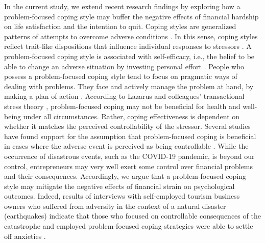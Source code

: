 \documentclass[man]{apa7}
\begin{document}
In the current study, we extend recent research findings by exploring how a problem-focused coping style may buffer the negative effects of financial hardship on life satisfaction and the intention to quit. 
Coping styles are generalized patterns of attempts to overcome adverse conditions \parencite[e.g.,][]{Carver1994}. 
In this sense, coping styles reflect trait-like dispositions that influence individual responses to stressors \parencite{Carver1994}.
A problem-focused coping style is associated with self-efficacy, i.e., the belief to be able to change an adverse situation by investing personal effort \parencite{Bandura.1986}. 
People who possess a problem-focused coping style tend to focus on pragmatic ways of dealing with problems.
They face and actively manage the problem at hand, by making a plan of action \parencite{Folkman1984, Folkman2004}.
According to Lazarus and colleagues' transactional stress theory \parencite[TST, e.g.,][]{Lazarus.2000, Folkman.1986, Lazarus.1978}, problem-focused coping may not be beneficial for health and well-being under all circumstances. 
Rather, coping effectiveness is dependent on whether it matches the perceived controllability of the stressor. 
Several studies have found support for the assumption that problem-focused coping is beneficial in cases where the adverse event is perceived as being controllable \parencite[e.g.,][]{Felton1984}. 
While the occurrence of disastrous events, such as the COVID-19 pandemic, is beyond our control, entrepreneurs may very well exert some control over financial problems and their consequences.
Accordingly, we argue that a problem-focused coping style may mitigate the negative effects of financial strain on psychological outcomes. 
Indeed, results of interviews with self-employed tourism business owners who suffered from adversity in the context of a natural disaster (earthquakes) indicate that those who focused on controllable consequences of the catastrophe and employed problem-focused coping strategies were able to settle off anxieties \parencite{Fang2020}. \par 
\end{document}
